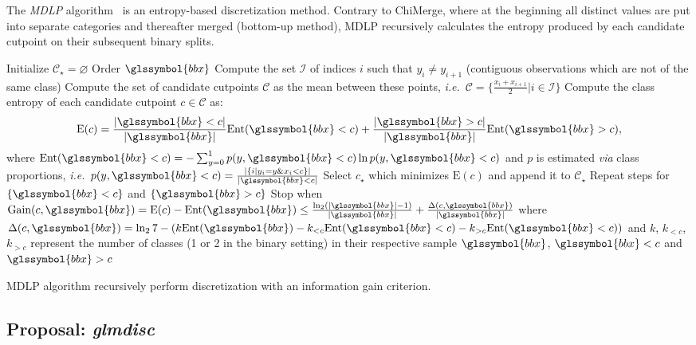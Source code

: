 The \textit{MDLP} algorithm~\cite{fayyad1993multi} is an entropy-based discretization method. Contrary to ChiMerge, where at the beginning all distinct values are put into separate categories and thereafter merged (bottom-up method), MDLP recursively calculates the entropy produced by each candidate cutpoint on their subsequent binary splits.

\begin{algorithm}[H]
 Initialize $\mathcal{C}_\star = \varnothing$\;
Order $\glssymbol{bbx}$\;
Compute the set $\mathcal{I}$ of indices $i$ such that $y_i \neq y_{i+1}$ (contiguous observations which are not of the same class)\;
Compute the set of candidate cutpoints $\mathcal{C}$ as the mean between these points, \textit{i.e.}\ $\mathcal{C} = \{\frac{x_i + x_{i+1}}{2} | i \in \mathcal{I} \}$\;
Compute the class entropy of each candidate cutpoint $c \in \mathcal{C}$ as:
\[ \text{E}(c) = \frac{|\glssymbol{bbx} < c|}{|\glssymbol{bbx}|} \text{Ent}(\glssymbol{bbx} < c) + \frac{|\glssymbol{bbx} > c|}{|\glssymbol{bbx}|} \text{Ent}(\glssymbol{bbx} > c), \]
where $\text{Ent}(\glssymbol{bbx} < c) = - \sum_{y=0}^1 p(y,\glssymbol{bbx} < c) \ln p(y,\glssymbol{bbx} < c)$ and $p$ is estimated \textit{via} class proportions, \textit{i.e.}\ $p(y,\glssymbol{bbx} < c) = \frac{|\{i | y_i = y \& x_i < c \}|}{|\glssymbol{bbx} < c|}$\;
Select $c_\star$ which minimizes $\text{E}(c)$ and append it to $\mathcal{C}_\star$\;
Repeat steps for $\{\glssymbol{bbx}< c\}$ and $\{\glssymbol{bbx} > c\}$\;
Stop when $\text{Gain}(c,\glssymbol{bbx}) = \text{E}(c) - \text{Ent}(\glssymbol{bbx}) \leq \frac{\ln_2 (|\glssymbol{bbx}|-1)}{|\glssymbol{bbx}|} + \frac{\Delta(c,\glssymbol{bbx}) }{|\glssymbol{bbx}|}$ where $\Delta(c,\glssymbol{bbx}) = \ln_2 7 - (k \text{Ent}(\glssymbol{bbx}) - k_{<c}\text{Ent}(\glssymbol{bbx} < c) - k_{>c}\text{Ent}(\glssymbol{bbx} < c))$ and $k$, $k_{<c}$, $k_{>c}$ represent the number of classes (1 or 2 in the binary setting) in their respective sample $\glssymbol{bbx}$, $\glssymbol{bbx} < c$ and $\glssymbol{bbx} > c$\;
 \caption{\label{mdlp} MDLP algorithm recursively perform discretization with an information gain criterion.}
\end{algorithm}


\subsection{Proposal: \textit{glmdisc}}


